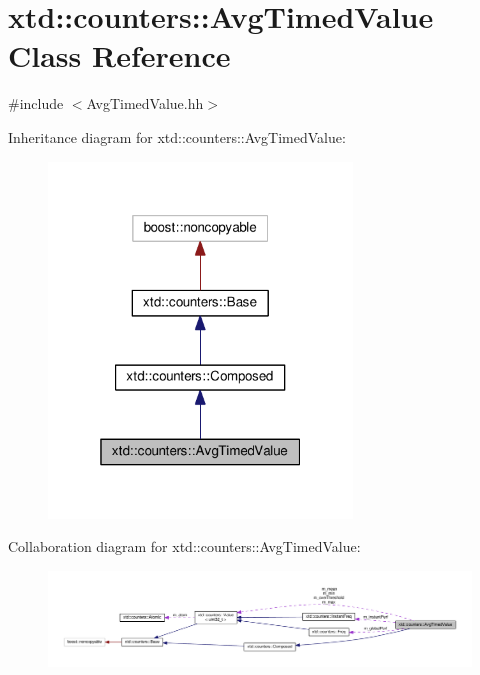 \hypertarget{classxtd_1_1counters_1_1AvgTimedValue}{}\section{xtd\+:\+:counters\+:\+:Avg\+Timed\+Value Class Reference}
\label{classxtd_1_1counters_1_1AvgTimedValue}


{\ttfamily \#include $<$Avg\+Timed\+Value.\+hh$>$}



Inheritance diagram for xtd\+:\+:counters\+:\+:Avg\+Timed\+Value\+:
\nopagebreak
\begin{figure}[H]
\begin{center}
\leavevmode
\includegraphics[width=229pt]{classxtd_1_1counters_1_1AvgTimedValue__inherit__graph}
\end{center}
\end{figure}


Collaboration diagram for xtd\+:\+:counters\+:\+:Avg\+Timed\+Value\+:
\nopagebreak
\begin{figure}[H]
\begin{center}
\leavevmode
\includegraphics[width=350pt]{classxtd_1_1counters_1_1AvgTimedValue__coll__graph}
\end{center}
\end{figure}
